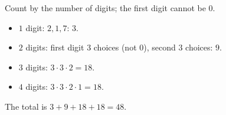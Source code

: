 Count by the number of digits; the first digit cannot be $0$.
\begin{itemize}
\item $1$ digit: $2,1,7$: $3$.
\item $2$ digits: first digit $3$ choices (not $0$), second $3$ choices: $9$.
\item $3$ digits: $3\cdot3\cdot2=18$.
\item $4$ digits: $3\cdot3\cdot2\cdot1=18$.
\end{itemize}
The total is $3+9+18+18=\boxed{48}$.
